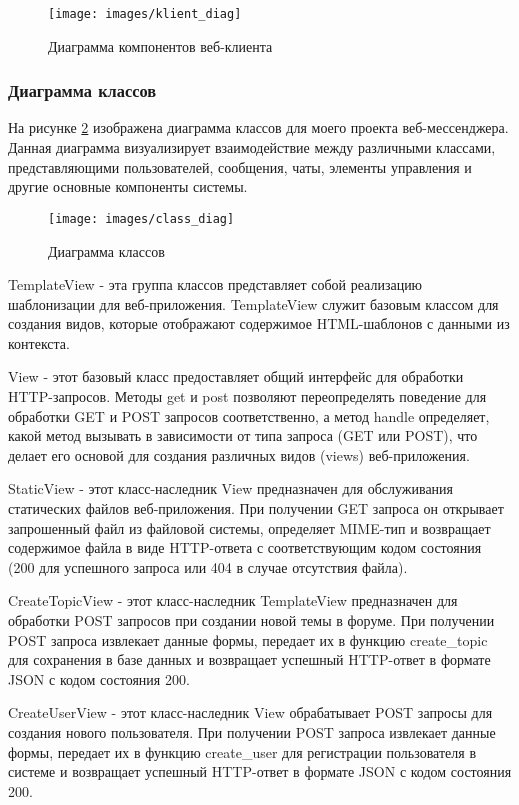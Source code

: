 \begin{figure}[H]
	\centering
	\texttt{[image: images/klient\_diag]}
	\caption{Диаграмма компонентов веб-клиента}
	\label{fig:klientdiag}
\end{figure}

\subsubsection{Диаграмма классов}
На рисунке \ref{fig:classdiag} изображена диаграмма классов для моего проекта веб-мессенджера. Данная диаграмма визуализирует взаимодействие между различными классами, представляющими пользователей, сообщения, чаты, элементы управления и другие основные компоненты системы.


\begin{figure}
	\centering
	\texttt{[image: images/class\_diag]}
	\caption{Диаграмма классов}
	\label{fig:classdiag}
\end{figure}

TemplateView - эта группа классов представляет собой реализацию шаблонизации для веб-приложения. TemplateView служит базовым классом для создания видов, которые отображают содержимое HTML-шаблонов с данными из контекста.

View - этот базовый класс предоставляет общий интерфейс для обработки HTTP-запросов. Методы get и post позволяют переопределять поведение для обработки GET и POST запросов соответственно, а метод handle определяет, какой метод вызывать в зависимости от типа запроса (GET или POST), что делает его основой для создания различных видов (views) веб-приложения.

StaticView - этот класс-наследник View предназначен для обслуживания статических файлов веб-приложения. При получении GET запроса он открывает запрошенный файл из файловой системы, определяет MIME-тип и возвращает содержимое файла в виде HTTP-ответа с соответствующим кодом состояния (200 для успешного запроса или 404 в случае отсутствия файла).

CreateTopicView - этот класс-наследник TemplateView предназначен для обработки POST запросов при создании новой темы в форуме. При получении POST запроса извлекает данные формы, передает их в функцию create\_topic для сохранения в базе данных и возвращает успешный HTTP-ответ в формате JSON с кодом состояния 200.

CreateUserView - этот класс-наследник View обрабатывает POST запросы для создания нового пользователя. При получении POST запроса извлекает данные формы, передает их в функцию create\_user для регистрации пользователя в системе и возвращает успешный HTTP-ответ в формате JSON с кодом состояния 200.

